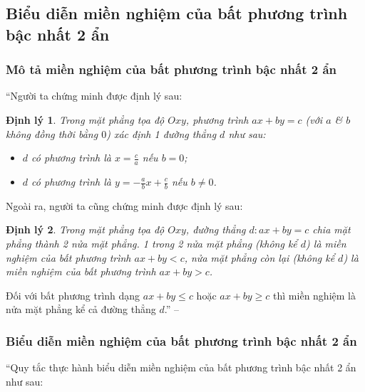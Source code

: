 \documentclass[oneside]{book}
\numberwithin{equation}{section}
\newtheorem{dinhly}{Định lý}[section]
\begin{document}
\subsection{Biểu diễn miền nghiệm của bất phương trình bậc nhất 2 ẩn}

\subsubsection{Mô tả miền nghiệm của bất phương trình bậc nhất 2 ẩn}
``Người ta chứng minh được định lý sau: 

\begin{dinhly}
	Trong mặt phẳng tọa độ $Oxy$, phương trình $ax + by = c$ (với $a$ \& $b$ không đồng thời bằng $0$) xác định 1 đường thẳng $d$ như sau:
	\begin{itemize}
		\item $d$ có phương trình là $x = \frac{c}{a}$ nếu $b = 0$;
		\item $d$ có phương trình là $y = -\frac{a}{b}x + \frac{c}{b}$ nếu $b\ne 0$.
	\end{itemize}
\end{dinhly}
Ngoài ra, người ta cũng chứng minh được định lý sau:

\begin{dinhly}
	Trong mặt phẳng tọa độ $Oxy$, đường thẳng $d:ax + by = c$ chia mặt phẳng thành 2 nửa mặt phẳng. 1 trong 2 nửa mặt phẳng (không kể $d$) là \emph{miền nghiệm} của bất phương trình $ax + by < c$, nửa mặt phẳng còn lại (không kể $d$) là \emph{miền nghiệm} của bất phương trình $ax + by > c$.
\end{dinhly}
Đối với bất phương trình dạng $ax + by\le c$ hoặc $ax + by\ge c$ thì miền nghiệm là nửa mặt phẳng kể cả đường thẳng $d$.'' -- \cite[p. 22]{SGK_Toan_10_Canh_Dieu_tap_1}

\subsubsection{Biểu diễn miền nghiệm của bất phương trình bậc nhất 2 ẩn}
``Quy tắc thực hành biểu diễn miền nghiệm của bất phương trình bậc nhất 2 ẩn như sau:
\end{document}

